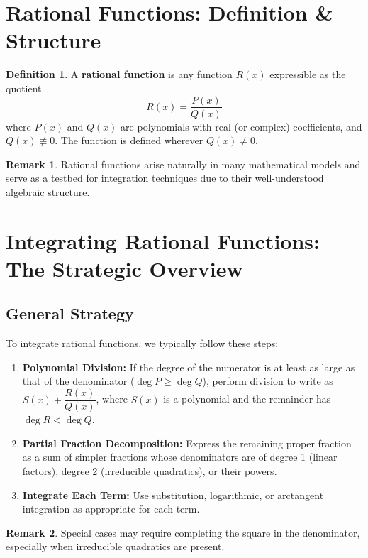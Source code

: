 \documentclass[11pt]{article}
\theoremstyle{definition}
\newtheorem{definition}{Definition}[section]
\newtheorem*{remark}{Remark}
\theoremstyle{plain}
\begin{document}
\section{Rational Functions: Definition \& Structure}

\begin{definition}
    A \textbf{rational function} is any function \( R(x) \) expressible as the quotient
    \[
        R(x) = \frac{P(x)}{Q(x)}
    \]
    where \( P(x) \) and \( Q(x) \) are polynomials with real (or complex) coefficients, and \( Q(x) \not\equiv 0 \). The function is defined wherever \( Q(x) \neq 0 \).
\end{definition}

\begin{remark}
    Rational functions arise naturally in many mathematical models and serve as a testbed for integration techniques due to their well-understood algebraic structure.
\end{remark}

\section{Integrating Rational Functions: The Strategic Overview}

\subsection{General Strategy}

To integrate rational functions, we typically follow these steps:
\begin{enumerate}[label=(\arabic*)]
    \item \textbf{Polynomial Division:} If the degree of the numerator is at least as large as that of the denominator (\(\deg P \geq \deg Q\)), perform division to write as \( S(x) + \dfrac{R(x)}{Q(x)} \), where \( S(x) \) is a polynomial and the remainder has \(\deg R < \deg Q\).
    \item \textbf{Partial Fraction Decomposition:} Express the remaining proper fraction as a sum of simpler fractions whose denominators are of degree 1 (linear factors), degree 2 (irreducible quadratics), or their powers.
    \item \textbf{Integrate Each Term:} Use substitution, logarithmic, or arctangent integration as appropriate for each term.
\end{enumerate}

\begin{remark}
    Special cases may require completing the square in the denominator, especially when irreducible quadratics are present.
\end{remark}
\end{document}
